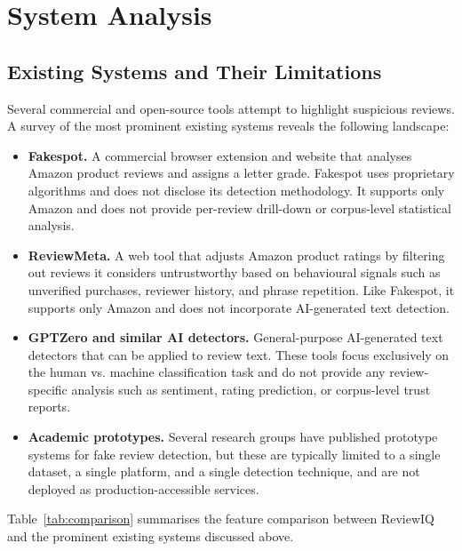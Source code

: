 \documentclass[12pt,a4paper,oneside]{report}
\begin{document}
\chapter{System Analysis}

\section{Existing Systems and Their Limitations}
Several commercial and open-source tools attempt to highlight suspicious
reviews. A survey of the most prominent existing systems reveals the
following landscape:

\begin{itemize}[leftmargin=*]
  \item \textbf{Fakespot.} A commercial browser extension and website
        that analyses Amazon product reviews and assigns a letter grade.
        Fakespot uses proprietary algorithms and does not disclose its
        detection methodology. It supports only Amazon and does not
        provide per-review drill-down or corpus-level statistical analysis.
  \item \textbf{ReviewMeta.} A web tool that adjusts Amazon product
        ratings by filtering out reviews it considers untrustworthy based
        on behavioural signals such as unverified purchases, reviewer
        history, and phrase repetition. Like Fakespot, it supports only
        Amazon and does not incorporate AI-generated text detection.
  \item \textbf{GPTZero and similar AI detectors.} General-purpose
        AI-generated text detectors that can be applied to review text.
        These tools focus exclusively on the human vs. machine
        classification task and do not provide any review-specific analysis
        such as sentiment, rating prediction, or corpus-level trust reports.
  \item \textbf{Academic prototypes.} Several research groups have
        published prototype systems for fake review detection, but these
        are typically limited to a single dataset, a single platform, and
        a single detection technique, and are not deployed as
        production-accessible services.
\end{itemize}

Table~\ref{tab:comparison} summarises the feature comparison between
ReviewIQ and the prominent existing systems discussed above.
\end{document}
